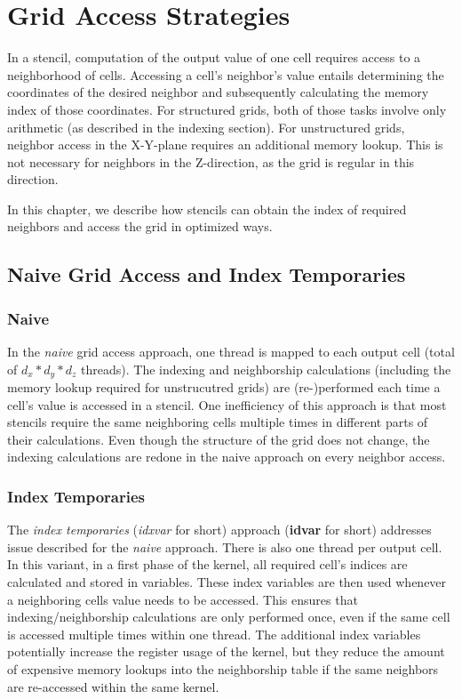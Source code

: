 \chapter{Grid Access Strategies} \label{sec:optimizations}

In a stencil, computation of the output value of one cell requires access to a neighborhood of cells. Accessing a cell's neighbor's value entails determining the coordinates of the desired neighbor and subsequently calculating the memory index of those coordinates. For structured grids, both of those tasks involve only arithmetic (as described in the indexing section). For unstructured grids, neighbor access in the X-Y-plane requires an additional memory lookup. This is not necessary for neighbors in the Z-direction, as the grid is regular in this direction.

In this chapter, we describe how stencils can obtain the index of required neighbors and access the grid in optimized ways.

\section{Naive Grid Access and Index Temporaries}

\subsection{Naive} In the \emph{naive} grid access approach, one thread is mapped to each output cell (total of $d_x*d_y*d_z$ threads). The indexing and neighborship calculations (including the memory lookup required for unstrucutred grids) are (re-)performed each time a cell's value is accessed in a stencil.  One inefficiency of this approach is that most stencils require the same neighboring cells multiple times in different parts of their calculations. Even though the structure of the grid does not change, the indexing calculations are redone in the naive approach on every neighbor access.

\subsection{Index Temporaries} The \emph{index temporaries} (\emph{idxvar} for short) approach (\textbf{idvar} for short) addresses issue described for the \emph{naive} approach. There is also one thread per output cell. In this variant, in a first phase of the kernel, all required cell's indices are calculated and stored in variables. These index variables are then used whenever a neighboring cells value needs to be accessed. This ensures that indexing/neighborship calculations are only performed once, even if the same cell is accessed multiple times within one thread. The additional index variables potentially increase the register usage of the kernel, but they reduce the amount of expensive memory lookups into the neighborship table if the same neighbors are re-accessed within the same kernel.

